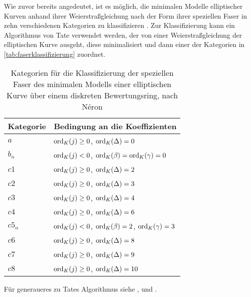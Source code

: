 Wie zuvor bereits angedeutet, ist es möglich, die minimalen Modelle
elliptischer Kurven anhand ihrer Weierstraßgleichung nach der Form
ihrer speziellen Faser in zehn verschiedenen Kategorien zu
klassifizieren \cite[vgl.][Theorem IV.8.2]{silverman2}.
Zur Klassifizierung kann ein Algorithmus von Tate verwendet werden,
der von einer Weierstraßgleichung der elliptischen Kurve ausgeht, diese
minimalisiert und dann einer der Kategorien in
\autoref{tab:faserklassifizierung} zuordnet.
\begin{table}[tbhp]
  \begin{center}
    \begin{tabular}{@{}ll@{}}
      \toprule
      Kategorie & Bedingung an die Koeffizienten\\
      \midrule[\heavyrulewidth]
      $a$& $\operatorname{ord}_{K}(j)\geq0$, $\operatorname{ord}_{K}(\Delta)=0$\\\midrule
      $b_n$& $\operatorname{ord}_{K}(j)<0$, $\operatorname{ord}_{K}(\beta)=\operatorname{ord}_{K}(\gamma)=0$\\\midrule
      $c1$& $\operatorname{ord}_{K}(j)\geq0$, $\operatorname{ord}_{K}(\Delta)=2$\\\midrule
      $c2$& $\operatorname{ord}_{K}(j)\geq0$, $\operatorname{ord}_{K}(\Delta)=3$\\\midrule
      $c3$& $\operatorname{ord}_{K}(j)\geq0$, $\operatorname{ord}_{K}(\Delta)=4$\\\midrule
      $c4$& $\operatorname{ord}_{K}(j)\geq0$, $\operatorname{ord}_{K}(\Delta)=6$\\\midrule
      $c5_n$& $\operatorname{ord}_{K}(j)<0$, $\operatorname{ord}_{K}(\beta)=2$, $\operatorname{ord}_{K}(\gamma)=3$\\\midrule
      $c6$& $\operatorname{ord}_{K}(j)\geq0$, $\operatorname{ord}_{K}(\Delta)=8$\\\midrule
      $c7$& $\operatorname{ord}_{K}(j)\geq0$, $\operatorname{ord}_{K}(\Delta)=9$\\\midrule
      $c8$& $\operatorname{ord}_{K}(j)\geq0$, $\operatorname{ord}_{K}(\Delta)=10$\\\bottomrule
    \end{tabular}
  \end{center}
  \caption{\label{tab:faserklassifizierung} Kategorien für die
    Klassifizierung der speziellen Faser des minimalen Modells einer
    elliptischen Kurve über einem diskreten Bewertungsring,
    nach Néron
  \cite[vgl.][Chapter 1.5]{neron}}
\end{table}
Für generaueres zu Tates Algorithmus siehe
\cite[Chapter IV.9]{silverman2},
\cite[Chapter 1.5]{neron} und \cite{tate}.
